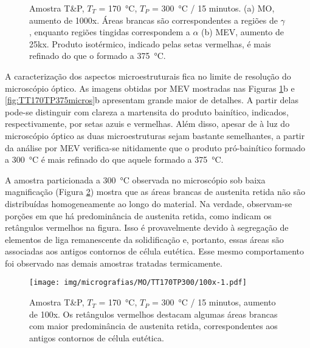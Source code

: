 \begin{figure}
  \centering
  \quad
  \caption{Amostra T\&P, $T_T$ = \SI{170}{\degreeCelsius}, $T_P$ = \SI{300}{\degreeCelsius} / 15 minutos. (a) MO, aumento de 1000x. Áreas brancas são correspondentes a regiões de $\gamma$, enquanto regiões tingidas correspondem a $\alpha$ (b) MEV, aumento de 25kx. Produto isotérmico, indicado pelas setas vermelhas, é mais refinado do que o formado a \SI{375}{\degreeCelsius}.}
  \label{fig:TT170TP300micros}
\end{figure}

A caracterização dos aspectos microestruturais fica no limite de resolução do microscópio óptico. As imagens obtidas por MEV mostradas nas Figuras \ref{fig:TT170TP300micros}b e \ref{fig:TT170TP375micros}b apresentam grande maior de detalhes. A partir delas pode-se distinguir com clareza a martensita do produto bainítico, indicados, respectivamente, por setas azuis e vermelhas. Além disso, apesar de à luz do microscópio óptico as duas microestruturas sejam bastante semelhantes, a partir da análise por MEV verifica-se nitidamente que o produto pró-bainítico formado a \SI{300}{\degreeCelsius} é mais refinado do que aquele formado a \SI{375}{\degreeCelsius}.

A amostra particionada a \SI{300}{\degreeCelsius} observada no microscópio sob baixa magnificação (Figura \ref{fig:TT170TP300-100x}) mostra que as áreas brancas de austenita retida não são distribuídas homogeneamente ao longo do material. Na verdade, observam-se porções em que há predominância de austenita retida, como indicam os retângulos vermelhos na figura. Isso é provavelmente devido à segregação de elementos de liga remanescente da solidificação e, portanto, essas áreas são associadas aos antigos contornos de célula eutética. Esse mesmo comportamento foi observado nas demais amostras tratadas termicamente.

\begin{figure}
  \texttt{[image: img/micrografias/MO/TT170TP300/100x-1.pdf]}
  \caption{Amostra T\&P, $T_T$ = \SI{170}{\degreeCelsius}, $T_P$ = \SI{300}{\degreeCelsius} / 15 minutos, aumento de 100x. Os retângulos vermelhos destacam algumas áreas brancas com maior predominância de austenita retida, correspondentes aos antigos contornos de célula eutética.}
  \label{fig:TT170TP300-100x}
\end{figure}

